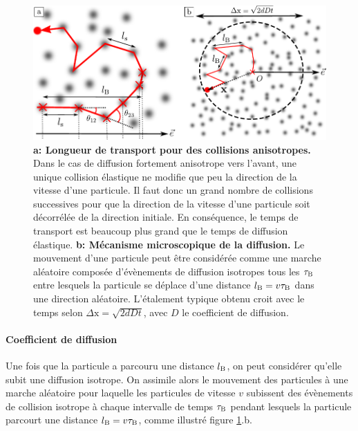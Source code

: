 \begin{figure}
\centering
\includegraphics[width=\textwidth]{Fig/Localisation/diffusion_classique.pdf}
\caption{\textbf{a: Longueur de transport pour des collisions anisotropes.} Dans le cas de diffusion fortement anisotrope vers l'avant, une unique collision élastique ne modifie que peu la direction de la vitesse d'une particule. Il faut donc un grand nombre de collisions successives pour que la direction de la vitesse d'une particule soit décorrélée de la direction initiale. En conséquence, le temps de transport est beaucoup plus grand que le temps de diffusion élastique. \textbf{b: Mécanisme microscopique de la diffusion.} Le mouvement d'une particule peut être considérée comme une marche aléatoire composée d'évènements de diffusion isotropes tous les $\tau_{\mathrm{B}}$ entre lesquels la particule se déplace d'une distance $l_{\mathrm{B}}=v \tau_{\mathrm{B}}$ dans une direction aléatoire. L'étalement typique obtenu croit avec le temps selon $\Delta \mathrm{x} =\sqrt{2dDt}$, avec $D$ le coefficient de diffusion.}
\label{fig:diffusion_classique}
\end{figure}





\paragraph*{Coefficient de diffusion}
Une fois que la particule a parcouru une distance $l_{\mathrm{B}}$, on peut considérer qu'elle subit une diffusion isotrope. On assimile alors le mouvement des particules à une marche aléatoire pour laquelle les particules de vitesse $v$ subissent des évènements de collision isotrope à chaque intervalle de temps $\tau_{\mathrm{B}}$ pendant lesquels la particule parcourt une distance $l_{\mathrm{B}}=v \tau_{\mathrm{B}}$, comme illustré figure \ref{fig:diffusion_classique}.b.

